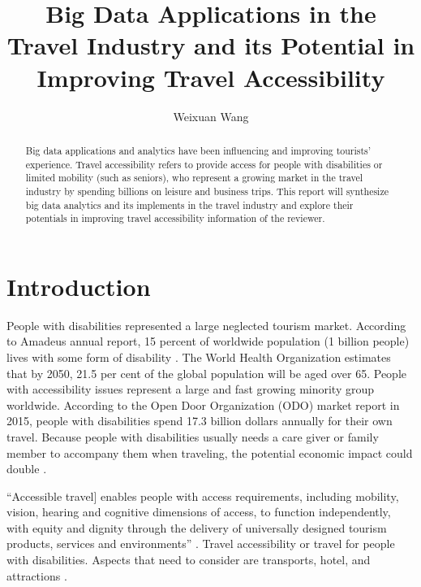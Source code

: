\documentclass[sigconf]{acmart}
\begin{document}
\title{Big Data Applications in the Travel Industry and its Potential in Improving Travel Accessibility}


\author{Weixuan Wang}


\renewcommand{\shortauthors}{Weixuan Wang}


\begin{abstract}
Big data applications and analytics have been influencing and improving tourists' experience. Travel accessibility refers to provide access for people with disabilities or limited mobility (such as seniors), who represent a growing market in the travel industry by spending billions on leisure and business trips. This report will synthesize big data analytics and its implements in the travel industry and explore their potentials in improving travel accessibility information of the reviewer.
\end{abstract}



\maketitle



\section{Introduction}
People with disabilities represented a large neglected tourism market. According to
Amadeus annual report, 15 percent of worldwide population (1 billion people) lives
with some form of disability \cite{Ama}. The World Health Organization estimates
that by 2050, 21.5 per cent of the global population
will be aged over 65. People with accessibility issues
represent a large and fast growing minority group
worldwide. According to the Open Door Organization (ODO) market report in 2015, people with disabilities spend 17.3 billion dollars annually for their own travel. Because people with disabilities usually needs a care giver or family member to accompany them when traveling, the potential economic impact could double \cite{ODO}. 

``Accessible travel] enables people with access requirements, including mobility,
vision, hearing and cognitive dimensions of access, to function independently, with
equity and dignity through the delivery of universally designed tourism products,
services and environments'' \cite{Ama}. Travel accessibility or travel for people with disabilities. Aspects that need to consider are transports, hotel, and attractions \cite{Ama}.
\end{document}
